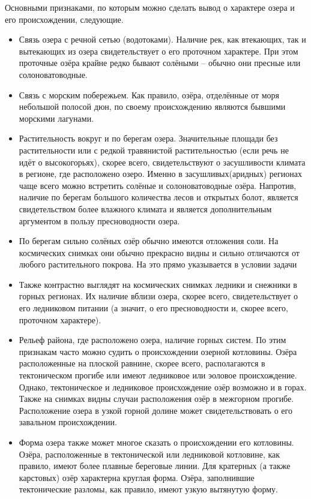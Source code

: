 Основными признаками, по которым можно сделать вывод о характере озера и его происхождении, следующие.
\begin{itemize}
    \item Связь озера с речной сетью (водотоками). Наличие рек, как втекающих, так и вытекающих из озера свидетельствует о его проточном характере. При этом проточные озёра крайне редко бывают солёными – обычно они пресные или солоноватоводные.
    \item Связь с морским побережьем. Как правило, озёра, отделённые от моря небольшой полосой дюн, по своему происхождению являются бывшими морскими лагунами.
    \item Растительность вокруг и по берегам озера. Значительные площади без растительности или с редкой травянистой растительностью (если речь не идёт о высокогорьях), скорее всего, свидетельствуют о засушливости климата в регионе, где расположено озеро. Именно в засушливых(аридных) регионах чаще всего можно встретить солёные и солоноватоводные озёра. Напротив, наличие по берегам большого количества лесов и открытых болот, является свидетельством более влажного климата и является дополнительным аргументом в пользу пресноводности озера.
    \item По берегам сильно солёных озёр обычно имеются отложения соли. На космических снимках они обычно прекрасно видны и сильно отличаются от любого растительного покрова. На это прямо указывается в условии задачи
    \item Также контрастно выглядят на космических снимках ледники и снежники в горных регионах. Их наличие вблизи озера, скорее всего, свидетельствует о его ледниковом питании (а значит, о его пресноводности и, скорее всего, проточном характере).
    \item Рельеф района, где расположено озера, наличие горных систем. По этим признакам часто можно судить о происхождении озерной котловины. Озёра расположенные на плоской равнине, скорее всего, располагаются в тектоническом прогибе или имеют ледниковое или эоловое происхождение. Однако, тектоническое и ледниковое происхождение озёр возможно и в горах. Также на снимках видны случаи расположения озёр в межгорном прогибе. Расположение озера в узкой горной долине может свидетельствовать о его завальном происхождении.
    \item Форма озера также может многое сказать о происхождении его котловины. Озёра, расположенные в тектонической или ледниковой котловине, как правило, имеют более плавные береговые линии. Для кратерных (а также карстовых) озёр характерна круглая форма. Озёра, заполнившие тектонические разломы, как правило, имеют узкую вытянутую форму.
\end{itemize}

